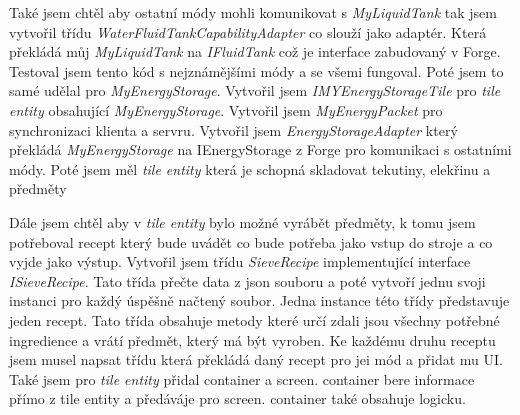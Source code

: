 \documentclass[FM,RP]{tulthesis}
\begin{document}
    Také jsem chtěl aby ostatní módy mohli komunikovat s \textit{MyLiquidTank} tak jsem vytvořil třídu \textit{WaterFluidTankCapabilityAdapter} co slouží jako adaptér. Která překládá můj  \textit{MyLiquidTank} na\textit{ IFluidTank} což je interface zabudovaný v Forge. Testoval jsem tento kód s nejznámějšími módy a se všemi fungoval.
    Poté jsem to samé udělal pro \textit{MyEnergyStorage}. Vytvořil jsem  \textit{IMYEnergyStorageTile} pro \textit{tile entity} obsahující  \textit{MyEnergyStorage}.  Vytvořil jsem \textit{MyEnergyPacket} pro synchronizaci klienta a servru. Vytvořil jsem \textit{EnergyStorageAdapter} který překládá \textit{MyEnergyStorage} na IEnergyStorage z Forge pro komunikaci s ostatními módy.
    Poté jsem měl\textit{ tile entity} která je schopná skladovat tekutiny, elekřinu a předměty \begin{comment}
        předměty jsem nikdy nezmínil
\end{comment}
    Dále jsem chtěl aby v\textit{ tile entity} bylo možné vyrábět předměty, k tomu jsem potřeboval recept který bude uvádět co bude potřeba jako vstup do stroje a co vyjde jako výstup. Vytvořil jsem třídu \textit{SieveRecipe} implementující interface \textit{ISieveRecipe}. Tato třída přečte data z json souboru a poté vytvoří jednu svoji instanci pro každý úspěšně načtený soubor. Jedna instance této třídy představuje jeden recept. Tato třída obsahuje metody které určí zdali jsou všechny potřebné ingredience a vrátí předmět, který má být vyroben.
    Ke každému druhu receptu jsem musel napsat třídu která překládá daný recept pro jei mód a přidat mu UI.
    Také jsem pro \textit{tile entity } přidal container a screen. container bere informace přímo z tile entity a předáváje pro screen. container také obsahuje logicku.
    

\begin{comment}
Při programování sívky jsem začal vytvořením třídy bloku sívky a jeho registrací do registrů. Tato třída odkazuje na \textit{tile entity} a UI kontejner. Dále jsem vytvořil vlastní implementace \textit{forge} rozhraní \textit{IEnergyStorage} a \textit{IFluidTank}. Tyto třídy slouží k ukládání elektřiny a vody. 
\end{comment}
\end{document}
